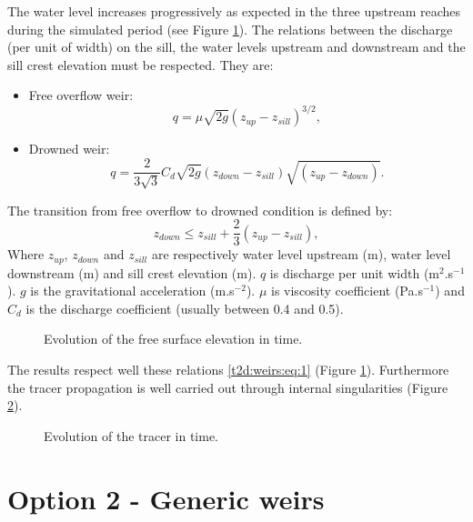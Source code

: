 The water level increases progressively as expected
in the three upstream reaches during the simulated period
(see Figure \ref{t2d:weirs:fig:z}). The relations between
the discharge (per unit of width) on the sill, the water levels
upstream and downstream and the sill crest elevation must be respected.
They are:
\begin{itemize}
\item Free overflow weir:
\begin{equation*}
q=\mu \sqrt{2g}\left( z_{up}-z_{sill} \right)^{3/2},
\end{equation*}
\item Drowned weir:
\begin{equation*}
q=\frac{2}{3\sqrt{3}}C_{d} \sqrt{2g}\left( z_{down}-z_{sill} \right)\sqrt{\left( z_{up}-z_{down} \right)}.
\end{equation*}
\end{itemize}
The transition from free overflow to drowned condition is defined by:
\begin{equation}
z_{down} \leq z_{sill}+ \frac{2}{3}\left( z_{up}-z_{sill} \right),
\label{t2d:weirs:eq:1}
\end{equation}
Where $z_{up}$, $z_{down}$ and $z_{sill}$ are respectively
water level upstream (m), water level downstream (m) and
sill crest elevation (m).  $q$ is discharge per unit width
(m$^2$.s$^{-1}$). $g$ is the gravitational acceleration (m.s$^{-2}$).
$\mu$ is viscosity coefficient (Pa.s$^{-1}$) and $C_d$ is the discharge coefficient
(usually between 0.4 and 0.5).

\begin{figure}[H]
 \centering
 \caption{Evolution of the free surface elevation in time.}
 \label{t2d:weirs:fig:z}
\end{figure}

The  results respect well these relations \eqref{t2d:weirs:eq:1}
(Figure  \ref{t2d:weirs:fig:z}). Furthermore the tracer propagation is well
 carried out through internal singularities (Figure \ref{t2d:weirs:fig:tracer}).

\begin{figure}[H]
 \centering
 \caption{Evolution of the tracer in time.}
 \label{t2d:weirs:fig:tracer}
\end{figure}

\section{Option 2 - Generic weirs}

